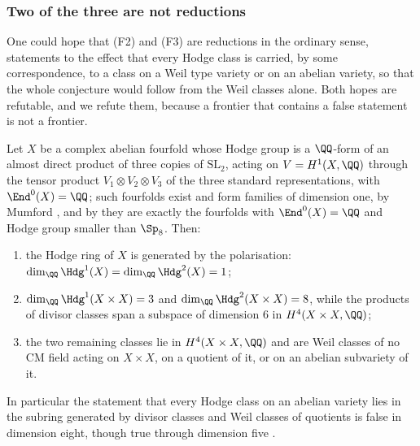 \subsubsection*{Two of the three are not reductions}

One could hope that (F2) and (F3) are reductions in the ordinary sense,
statements to the effect that every Hodge class is carried, by some
correspondence, to a class on a Weil type variety or on an abelian variety,
so that the whole conjecture would follow from the Weil classes alone. Both
hopes are refutable, and we refute them, because a frontier that contains a
false statement is not a frontier.

\begin{proposition}\label{prop:mumfordproduct}
Let $X$ be a complex abelian fourfold whose Hodge group is a $\QQ$-form of an
almost direct product of three copies of $\mathrm{SL}_{2}$, acting on
$V=H^{1}(X,\QQ)$ through the tensor product $V_{1}\otimes V_{2}\otimes V_{3}$
of the three standard representations, with $\End^{0}(X)=\QQ$; such
fourfolds exist and form families of dimension one, by Mumford
\cite{Mum69}, and by \cite[2.5(i)]{MZ99} they are exactly the fourfolds
with $\End^{0}(X)=\QQ$ and Hodge group smaller than $\Sp_{8}$. Then:
\begin{enumerate}[label=\textup{(\roman*)},nosep,leftmargin=2.6em]
\item the Hodge ring of $X$ is generated by the polarisation:
  $\dim_{\QQ}\Hdg^{1}(X)=\dim_{\QQ}\Hdg^{2}(X)=1$;
\item $\dim_{\QQ}\Hdg^{1}(X\times X)=3$ and $\dim_{\QQ}\Hdg^{2}(X\times X)=8$,
  while the products of divisor classes span a subspace of dimension $6$
  in $H^{4}(X\times X,\QQ)$;
\item the two remaining classes lie in $H^{4}(X\times X,\QQ)$ and are Weil
  classes of no CM field acting on $X\times X$, on a quotient of it, or on an
  abelian subvariety of it.
\end{enumerate}
In particular the statement that every Hodge class on an abelian variety
lies in the subring generated by divisor classes and Weil classes of
quotients is false in dimension eight, though true through dimension five
\cite{MZ99}.
\end{proposition}

